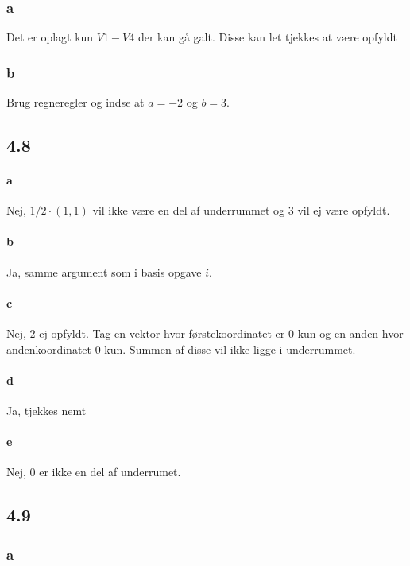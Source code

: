 			\subsubsection{a}

				Det er oplagt kun $V1-V4$ der kan gå galt. Disse kan let tjekkes at være opfyldt

			\subsubsection{b}

				Brug regneregler og indse at $a=-2$ og $b=3$.

		\subsection{4.8}

			\paragraph{a} Nej, $1/2\cdot (1,1)$ vil ikke være en del af underrummet og 3 vil ej være opfyldt.

			\paragraph{b} Ja, samme argument som i basis opgave $i$.

			\paragraph{c} Nej, 2 ej opfyldt. Tag en vektor hvor førstekoordinatet er $0$ kun og en anden hvor andenkoordinatet $0$ kun. Summen af disse vil ikke ligge i underrummet.

			\paragraph{d} Ja, tjekkes nemt

			\paragraph{e} Nej, $0$ er ikke en del af underrumet.

		\subsection{4.9}

			\subsubsection{a}

